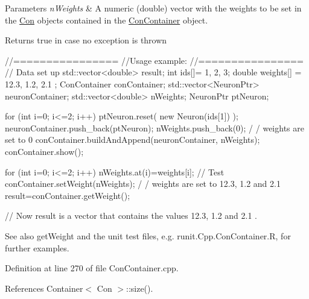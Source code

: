 \begin{DoxyParams}{Parameters}
{\em nWeights} & A numeric (double) vector with the weights to be set in the \hyperlink{class_con}{Con} objects contained in the \hyperlink{class_con_container}{ConContainer} object.\\
\hline
\end{DoxyParams}
\begin{DoxyReturn}{Returns}
true in case no exception is thrown
\end{DoxyReturn}

\begin{DoxyCode}
        //================
        //Usage example:
        //================
        // Data set up
                std::vector<double> result;
                        int ids[]= {1, 2, 3};
                        double weights[] = {12.3, 1.2, 2.1 };
                        ConContainer conContainer;
                        std::vector<NeuronPtr> neuronContainer;
                        std::vector<double> nWeights;
                        NeuronPtr ptNeuron;

                        for (int i=0; i<=2; i++) {
                        ptNeuron.reset( new Neuron(ids[1]) );
                        neuronContainer.push_back(ptNeuron);
                        nWeights.push_back(0);                                  /
      / weights are set to 0
                        }
                        conContainer.buildAndAppend(neuronContainer, nWeights);
                        conContainer.show();

                        for (int i=0; i<=2; i++) {
                                nWeights.at(i)=weights[i];
                        }
        // Test
                        conContainer.setWeight(nWeights);                       /
      / weights are set to 12.3, 1.2 and 2.1
                        result=conContainer.getWeight();

        // Now result is a vector that contains the values 12.3, 1.2 and 2.1 .
\end{DoxyCode}


\begin{DoxySeeAlso}{See also}
getWeight and the unit test files, e.g. runit.Cpp.ConContainer.R, for further examples. 
\end{DoxySeeAlso}


Definition at line 270 of file ConContainer.cpp.



References Container$<$ Con $>$::size().


